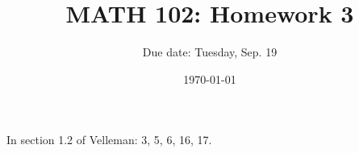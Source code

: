 \documentclass[12pt]{amsart}
\title{ MATH 102: Homework 3}
\author{Due date: Tuesday, Sep. 19}
\date{\today}
\begin{document}
\maketitle

In section 1.2 of Velleman: 3, 5, 6, 16, 17.



\printbibliography 
%
%
\end{document}
